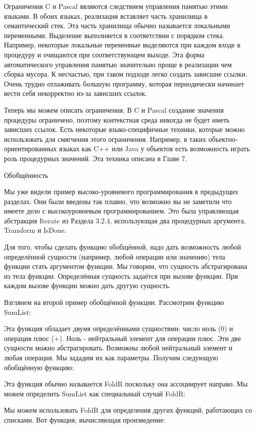 Ограничения C и Pascal являются следствием управления памятью этими языками. В обоих языках, реализация вставляет часть хранилища в семантический стек. Эта часть хранилища обычно называется локальными переменными. Выделение выполняется в соответствии с порядком стека. Например, некоторые локальные переменные выделяются при каждом входе в процедуру и очищаются при соответствующем выходе. Эта форма автоматического управления памятью значительно проще в реализации чем сборка мусора. К несчастью, при таком подходе легко создать зависшие ссылки. Очень трудно отлаживать большую программу, которая периодически начинает вести себя некорректно из-за зависших ссылок.

Теперь мы можем описать ограничения. В C и Pascal создание значения процедуры ограничено, поэтому контекстная среда никогда не будет иметь зависших ссылок. Есть некоторые языко-специфичные техники, которые можно использовать для смягчения этого ограничения. Например, в таких объектно-ориентированных языках как C++ или Java у объектов есть возможность играть роль процедурных значений. Эта техника описана в Главе 7.

Обобщённость

Мы уже видели пример высоко-уровневого программирования в предыдущих разделах. Они были введены так плавно, что возможно вы не заметили что имеете дело с высокоуровневым программированием. Это была управляющая абстракция Iterate из Раздела 3.2.4, использующая два процедурных аргумента, Transform и IsDone.

Для того, чтобы сделать функцию обобщённой, надо дать возможность любой определённой сущности (например, любой операции или значению) тела функции стать аргументом функции. Мы говорим, что сущность абстрагирована из тела функции. Определённая сущность задаётся при вызове функции. При каждом вызове функции можно дать другую сущность.

Взглянем на второй пример обобщённой функции. Рассмотрим функцию SumList:

Эта функция обладает двумя определёнными сущностями: число ноль (0) и операция плюс (+). Ноль - нейтральный элемент для операции плюс. Эти две сущности можно абстрагировать. Возможны любой нейтральный элемент и любая операция. Мы зададим их как параметры. Получим следующую обобщённую функцию:

Эта функция обычно называется FoldR поскольку она ассоциирует направо. Мы можем определить SumList как специальный случай FoldR:

Мы можем использовать FoldR для определения других функций, работающих со списками. Вот функция, вычисляющая произведение:

